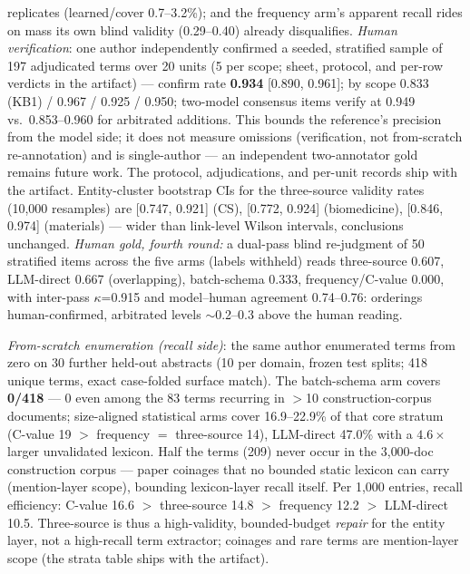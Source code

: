 \documentclass[sigconf,nonacm,anonymous]{acmart}
\begin{document}
replicates (learned/cover 0.7--3.2\%); and the frequency arm's
apparent recall rides on mass its own blind validity (0.29--0.40)
already disqualifies. \emph{Human verification}: one author
independently confirmed a seeded, stratified sample of 197 adjudicated
terms over 20 units (5 per scope; sheet, protocol, and per-row
verdicts in the artifact) --- confirm rate \textbf{0.934} [0.890,
0.961]; by scope 0.833 (KB1) / 0.967 / 0.925 / 0.950; two-model
consensus items verify at 0.949 vs.\ 0.853--0.960 for arbitrated
additions. This bounds the reference's precision from the model side;
it does not measure omissions (verification, not from-scratch
re-annotation) and is single-author --- an independent two-annotator
gold remains future work. The protocol, adjudications, and per-unit
records ship with the artifact. Entity-cluster bootstrap CIs for the three-source
validity rates (10{,}000 resamples) are [0.747, 0.921] (CS),
[0.772, 0.924] (biomedicine), [0.846, 0.974] (materials) --- wider
than link-level Wilson intervals, conclusions unchanged.
\emph{Human gold, fourth round:} a dual-pass blind re-judgment of 50
stratified items across the five arms (labels withheld) reads
three-source 0.607, LLM-direct 0.667 (overlapping), batch-schema
0.333, frequency/C-value 0.000, with inter-pass $\kappa$=0.915 and
model--human agreement 0.74--0.76: orderings human-confirmed,
arbitrated levels ${\sim}$0.2--0.3 above the human reading.

\emph{From-scratch enumeration (recall side)}: the same author
enumerated terms from zero on 30 further held-out abstracts (10 per
domain, frozen test splits; 418 unique terms, exact case-folded
surface match). The batch-schema arm covers \textbf{0/418} --- 0 even
among the 83 terms recurring in $>$10 construction-corpus documents;
size-aligned statistical arms cover 16.9--22.9\% of that core stratum
(C-value 19 $>$ frequency $=$ three-source 14), LLM-direct 47.0\%
with a $4.6\times$ larger unvalidated lexicon. Half the terms (209)
never occur in the 3{,}000-doc construction corpus --- paper coinages
that no bounded static lexicon can carry (mention-layer scope),
bounding lexicon-layer recall itself. Per 1{,}000 entries,
recall efficiency: C-value 16.6 $>$ three-source 14.8 $>$ frequency
12.2 $>$ LLM-direct 10.5. Three-source is thus a high-validity,
bounded-budget \emph{repair} for the entity layer, not a high-recall
term extractor; coinages and rare terms are mention-layer scope (the
strata table ships with the artifact).
\end{document}
